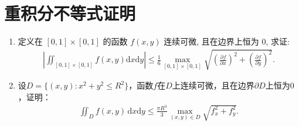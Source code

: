 \documentclass[../../main.tex]{subfiles}%
\begin{document}
\section{重积分不等式证明}

\begin{example}
\begin{enumerate}[(1)]
\item 定义在 $[0,1]\times[0,1]$ 的函数 $f(x,y)$ 连续可微, 且在边界上恒为 $0$, 求证:
\begin{align*}
\left| \iint_{[0,1]\times[0,1]} f(x,y)\mathrm{d}x\mathrm{d}y \right| \leqslant \frac{1}{6} \max\limits_{[0,1]\times[0,1]} \sqrt{\left( \frac{\partial f}{\partial x} \right)^2 + \left( \frac{\partial f}{\partial y} \right)^2}.
\end{align*}

\item 设$D=\{(x,y):x^2+y^2\leqslant R^2\}$，函数$f$在$D$上连续可微，且在边界$\partial D$上恒为$0$，证明：
\begin{align*}
\iint_D f(x,y)\,\mathrm{d}x\mathrm{d}y
\leqslant \frac{\pi R^3}{3}\max_{(x,y)\in D}\sqrt{f_x^2+f_y^2}.
\end{align*}
\end{enumerate}
\end{example}
\end{document}
